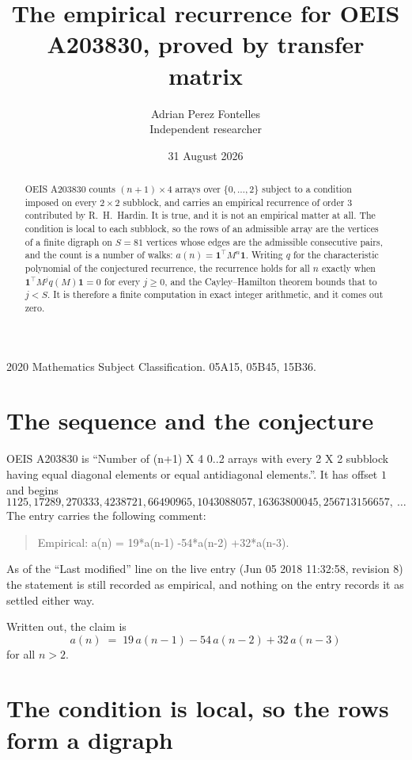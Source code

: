 \documentclass[11pt,a4paper]{article}
\title{The empirical recurrence for OEIS A203830, proved by transfer matrix}
\author{Adrian Perez Fontelles\\ \small Independent researcher}
\date{31 August 2026}
\theoremstyle{plain}
\theoremstyle{definition}
\begin{document}
\maketitle

\begin{abstract}
OEIS A203830 counts $(n+1)\times4$ arrays over $\{0,\dots,2\}$ subject to a condition imposed on
every $2\times2$ subblock, and carries an empirical recurrence of order $3$ contributed
by R.~H.~Hardin. It is true, and it is not an empirical matter at all. The condition is local
to each subblock, so the rows of an admissible array are the vertices of a finite digraph
on $S=81$ vertices whose edges are the admissible consecutive pairs, and the count is a
number of walks: $a(n)=\mathbf{1}^{\!\top}M^{n}\mathbf{1}$. Writing $q$
for the characteristic polynomial of the conjectured recurrence, the recurrence holds for all
$n$ exactly when $\mathbf{1}^{\!\top}M^{j}q(M)\mathbf{1}=0$ for every $j\ge0$, and the
Cayley--Hamilton theorem bounds that to $j<S$. It is therefore a finite computation in exact
integer arithmetic, and it comes out zero.
\end{abstract}

\noindent\small 2020 Mathematics Subject Classification. 05A15, 05B45, 15B36.\normalsize

\section{The sequence and the conjecture}

OEIS A203830 is ``Number of (n+1) X 4 0..2 arrays with every 2 X 2 subblock having equal diagonal elements or equal antidiagonal elements.''. It has offset $1$ and begins
\[
1125, 17289, 270333, 4238721, 66490965, 1043088057, 16363800045, 256713156657,\ \dots
\]
The entry carries the following comment:
\begin{quote}\small
Empirical: a(n) = 19*a(n-1) -54*a(n-2) +32*a(n-3).
\end{quote}
As of the ``Last modified'' line on the live entry (Jun 05 2018 11:32:58, revision 8) the statement is
still recorded as empirical, and nothing on the entry records it as settled either way.

Written out, the claim is
\begin{equation}\label{eq:conj}
a(n)\;=\;19\,a(n-1) - 54\,a(n-2) + 32\,a(n-3)
\end{equation}
for all $n>2$.

\section{The condition is local, so the rows form a digraph}
\end{document}
